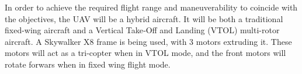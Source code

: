 In order to achieve the required flight range and maneuverability to coincide with the objectives, the UAV will be a hybrid aircraft. It will be both a traditional fixed-wing aircraft and a Vertical Take‐Off and Landing (VTOL) multi-rotor aircraft.  A Skywalker X8 frame is being used, with 3 motors extruding it. These motors will act as a tri-copter when in VTOL mode, and the front motors will rotate forwars when in fixed wing flight mode.  

